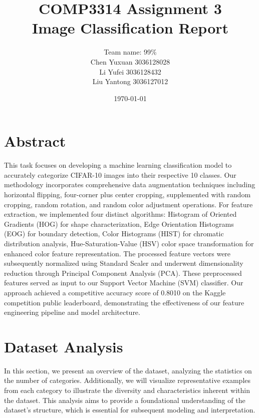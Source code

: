 \documentclass[a4paper,11pt]{article}
\begin{document}
\title{COMP3314 Assignment 3 \\ Image Classification Report}
\author{
    Team name: 99\% \\
    \vspace{0.5cm} 
    Chen Yuxuan 3036128028\\
    Li Yufei 3036128432\\
    Liu Yantong 3036127012
}
\date{\today}

\maketitle
\newpage
\tableofcontents
\newpage
\section*{Abstract}

This task focuses on developing a machine learning classification model to accurately categorize CIFAR-10 images into their respective 10 classes. Our methodology incorporates comprehensive data augmentation techniques including horizontal flipping, four-corner plus center cropping, supplemented with random cropping, random rotation, and random color adjustment operations. For feature extraction, we implemented four distinct algorithms: Histogram of Oriented Gradients (HOG) for shape characterization, Edge Orientation Histograms (EOG) for boundary detection, Color Histograms (HIST) for chromatic distribution analysis, Hue-Saturation-Value (HSV) color space transformation for enhanced color feature representation. The processed feature vectors were subsequently normalized using Standard Scaler and underwent dimensionality reduction through Principal Component Analysis (PCA). These preprocessed features served as input to our Support Vector Machine (SVM) classifier. Our approach achieved a competitive accuracy score of 0.8010 on the Kaggle competition public leaderboard, demonstrating the effectiveness of our feature engineering pipeline and model architecture.

\section{Dataset Analysis}
In this section, we present an overview of the dataset, analyzing the statistics on the number of categories. Additionally, we will visualize representative examples from each category to illustrate the diversity and characteristics inherent within the dataset. This analysis aims to provide a foundational understanding of the dataset's structure, which is essential for subsequent modeling and interpretation.
\end{document}
